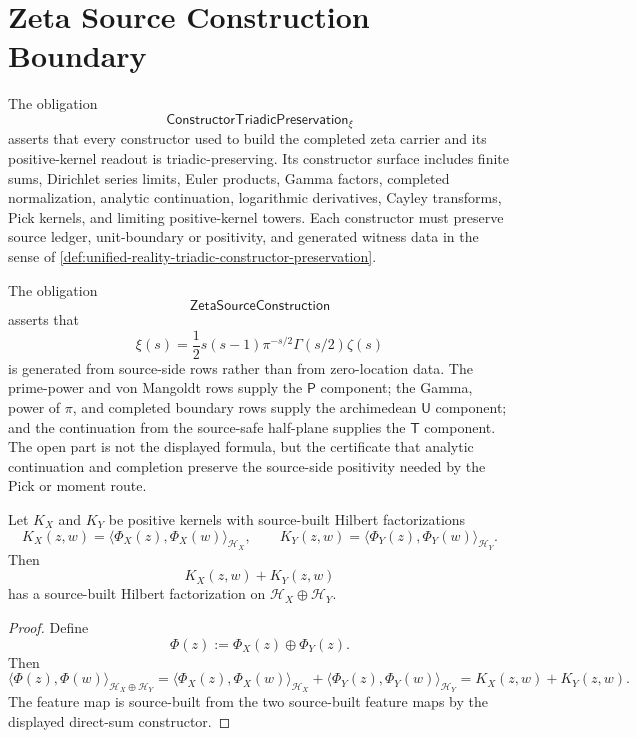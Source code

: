 \section{Zeta Source Construction Boundary}
\label{sec:rh-zeta-source-construction-boundary}

\begin{definition}
\label{def:rh-constructor-triadic-preservation-xi}
The obligation
$$
\mathsf{ConstructorTriadicPreservation}_{\xi}
$$
asserts that every constructor used to build the completed zeta carrier
and its positive-kernel readout is triadic-preserving. Its constructor
surface includes finite sums, Dirichlet series limits, Euler products,
Gamma factors, completed normalization, analytic continuation,
logarithmic derivatives, Cayley transforms, Pick kernels, and limiting
positive-kernel towers. Each constructor must preserve source ledger,
unit-boundary or positivity, and generated witness data in the sense of
\autoref{def:unified-reality-triadic-constructor-preservation}.
\end{definition}

\begin{definition}[ZetaSourceConstruction]
\label{def:rh-zeta-source-construction}
The obligation
$$
\mathsf{ZetaSourceConstruction}
$$
asserts that
$$
\xi(s)
=
\frac12s(s-1)\pi^{-s/2}\Gamma(s/2)\zeta(s)
$$
is generated from source-side rows rather than from zero-location data.
The prime-power and von Mangoldt rows supply the $\mathsf P$ component;
the Gamma, power of $\pi$, and completed boundary rows supply the
archimedean $\mathsf U$ component; and the continuation from the
source-safe half-plane supplies the $\mathsf T$ component. The open part
is not the displayed formula, but the certificate that analytic
continuation and completion preserve the source-side positivity needed
by the Pick or moment route.
\end{definition}

\begin{theorem}
\label{thm:rh-direct-sums-preserve-source-pick-positivity}
Let $K_X$ and $K_Y$ be positive kernels with source-built Hilbert
factorizations
$$
K_X(z,w)=\langle\Phi_X(z),\Phi_X(w)\rangle_{\mathcal H_X},
\qquad
K_Y(z,w)=\langle\Phi_Y(z),\Phi_Y(w)\rangle_{\mathcal H_Y}.
$$
Then
$$
K_X(z,w)+K_Y(z,w)
$$
has a source-built Hilbert factorization on
$\mathcal H_X\oplus\mathcal H_Y$.
\end{theorem}

\begin{proof}
Define
$$
\Phi(z):=\Phi_X(z)\oplus\Phi_Y(z).
$$
Then
$$
\langle\Phi(z),\Phi(w)\rangle_{\mathcal H_X\oplus\mathcal H_Y}
=
\langle\Phi_X(z),\Phi_X(w)\rangle_{\mathcal H_X}
+
\langle\Phi_Y(z),\Phi_Y(w)\rangle_{\mathcal H_Y}
=
K_X(z,w)+K_Y(z,w).
$$
The feature map is source-built from the two source-built feature maps by
the displayed direct-sum constructor.
\end{proof}

